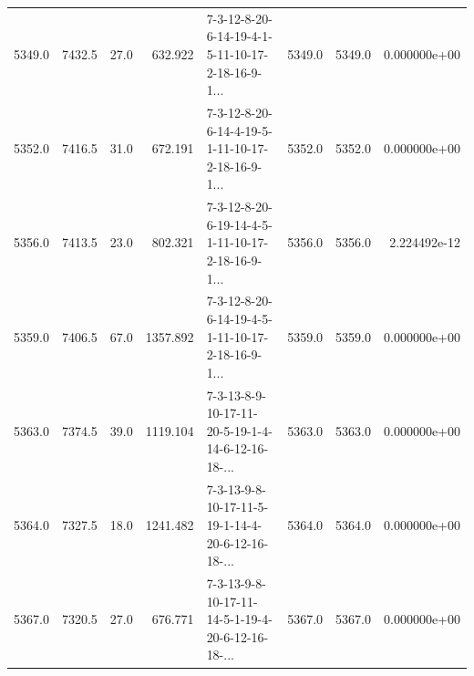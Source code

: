 \begin{tabular}{rrrrlrrr}
 5349.0 &  7432.5 &           27.0 &            632.922 &  7-3-12-8-20-6-14-19-4-1-5-11-10-17-2-18-16-9-1... &        5349.0 &          5349.0 &  0.000000e+00 \\
 5352.0 &  7416.5 &           31.0 &            672.191 &  7-3-12-8-20-6-14-4-19-5-1-11-10-17-2-18-16-9-1... &        5352.0 &          5352.0 &  0.000000e+00 \\
 5356.0 &  7413.5 &           23.0 &            802.321 &  7-3-12-8-20-6-19-14-4-5-1-11-10-17-2-18-16-9-1... &        5356.0 &          5356.0 &  2.224492e-12 \\
 5359.0 &  7406.5 &           67.0 &           1357.892 &  7-3-12-8-20-6-14-19-4-5-1-11-10-17-2-18-16-9-1... &        5359.0 &          5359.0 &  0.000000e+00 \\
 5363.0 &  7374.5 &           39.0 &           1119.104 &  7-3-13-8-9-10-17-11-20-5-19-1-4-14-6-12-16-18-... &        5363.0 &          5363.0 &  0.000000e+00 \\
 5364.0 &  7327.5 &           18.0 &           1241.482 &  7-3-13-9-8-10-17-11-5-19-1-14-4-20-6-12-16-18-... &        5364.0 &          5364.0 &  0.000000e+00 \\
 5367.0 &  7320.5 &           27.0 &            676.771 &  7-3-13-9-8-10-17-11-14-5-1-19-4-20-6-12-16-18-... &        5367.0 &          5367.0 &  0.000000e+00 \\
\bottomrule
\end{tabular}
